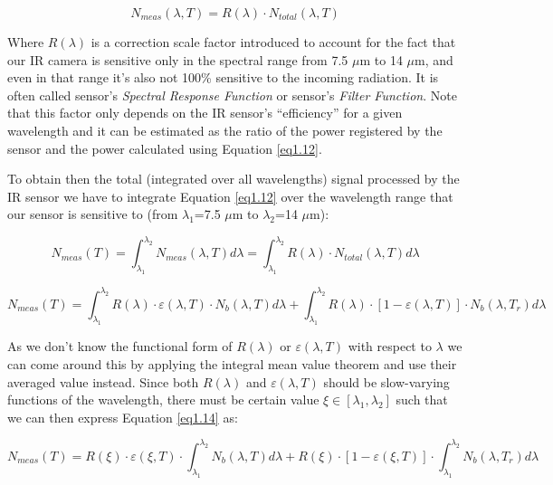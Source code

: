 		\begin{equation}\label{eq1.12}
			N_{meas}(\lambda,T)=R(\lambda) \cdot N_{total}(\lambda,T)
		\end{equation}\bigskip
		
		Where $R(\lambda)$ is a correction scale factor introduced to account for the fact that our IR camera is sensitive only in the spectral range from 7.5 $\mu$m to 14 $\mu$m, and even in that range it’s also not 100\% sensitive to the incoming radiation. It is often called sensor’s \textit{Spectral Response Function} or sensor’s \textit{Filter Function}. Note that this factor only depends on the IR sensor’s “efficiency” for a given wavelength and it can be estimated as the ratio of the power registered by the sensor and the power calculated using Equation \ref{eq1.12}.
		
		To obtain then the total (integrated over all wavelengths) signal processed by the IR sensor we have to integrate Equation \ref{eq1.12} over the wavelength range that our sensor is sensitive to (from $\lambda_{1}$=7.5 $\mu$m to $\lambda_{2}$=14 $\mu$m):
		
		\begin{equation}\label{eq1.13}
			N_{meas}(T)= \int_{\lambda_{1}}^{\lambda_{2}} N_{meas}(\lambda,T) d\lambda = \int_{\lambda_{1}}^{\lambda_{2}} R(\lambda) \cdot N_{total}(\lambda,T) d\lambda
		\end{equation}		
		
		\begin{equation}\label{eq1.14}
			N_{meas}(T)= \int_{\lambda_{1}}^{\lambda_{2}} R(\lambda) \cdot \varepsilon(\lambda,T) \cdot N_{b}(\lambda,T) d\lambda + \int_{\lambda_{1}}^{\lambda_{2}} R(\lambda) \cdot [1- \varepsilon(\lambda,T)] \cdot N_{b}(\lambda,T_{r}) d\lambda
		\end{equation}\bigskip	
		
		As we don’t know the functional form of $R(\lambda)$ or $\varepsilon(\lambda,T)$ with respect to $\lambda$ we can come around this by applying the integral mean value theorem and use their averaged value instead. Since both $R(\lambda)$ and $\varepsilon(\lambda,T)$ should be slow-varying functions of the wavelength, there must be certain value $\xi \in [\lambda_{1},\lambda_{2}]$ such that we can then express Equation \ref{eq1.14} as:
		
		\begin{equation}\label{eq1.15}
			N_{meas}(T)= R(\xi) \cdot \varepsilon(\xi,T) \cdot \int_{\lambda_{1}}^{\lambda_{2}} N_{b}(\lambda,T) d\lambda + R(\xi) \cdot [1- \varepsilon(\xi,T)] \cdot \int_{\lambda_{1}}^{\lambda_{2}} N_{b}(\lambda,T_{r}) d\lambda
		\end{equation}	
		
